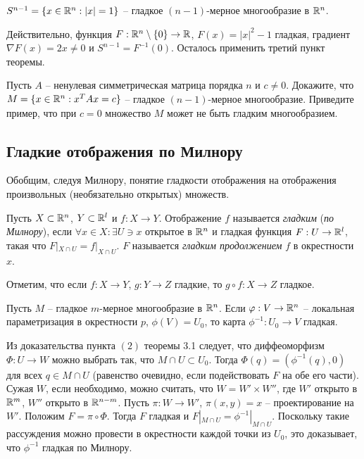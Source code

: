 \begin{example}
	$S^{n-1} = \{x \in \mathbb{R}^n : |x| = 1\}$ -- гладкое $(n-1)$-мерное многообразие в $\mathbb{R}^n$.
\end{example}

\begin{myproof}
	Действительно, функция $F : \mathbb{R}^n \setminus \{0\} \to \mathbb{R}$, $F(x) = |x|^2 - 1$ гладкая, градиент $\nabla F(x) = 2x \neq 0$ и $S^{n-1} = F^{-1}(0)$. 
	Осталось применить третий пункт теоремы.
\end{myproof}

\begin{problem}
	Пусть $A$ -- ненулевая симметрическая матрица порядка $n$ и $c \neq 0$.
	Докажите, что $M = \{x \in \mathbb{R}^n : x^T A x = c\}$ -- гладкое $(n-1)$-мерное многообразие. 
	Приведите пример, что при $c = 0$ множество $M$ может не быть гладким многообразием.
\end{problem}

\subsection{Гладкие отображения по Милнору}

Обобщим, следуя Милнору, понятие гладкости отображения на отображения произвольных (необязательно открытых) множеств.

\begin{definition}
	Пусть $X \subset \mathbb{R}^n$, $Y \subset \mathbb{R}^l$ и $f : X \to Y$. 
	Отображение $f$ называется \textit{гладким} (\textit{по Милнору}), если $\forall x \in X : \exists U \ni x$ открытое в $\mathbb{R}^n$ и 
	гладкая функция $F : U \to \mathbb{R}^l$, такая что $F|_{X \cap U} = f|_{X \cap U}$. 
	$F$ называется \textit{гладким продолжением} $f$ в окрестности $x$.
\end{definition}

\begin{note}
	Отметим, что если $f : X \to Y$, $g : Y \to Z$ гладкие, то $g \circ f : X \to Z$ гладкое.
\end{note}

\begin{lemma}
	Пусть $M$ -- гладкое $m$-мерное многообразие в $\mathbb{R}^n$. Если $\varphi: V \to \mathbb{R}^n$ -- локальная параметризация в окрестности $p$, 
	$\phi(V) = U_0$, то карта $\phi^{-1} : U_0 \to V$ гладкая.
\end{lemma}

\begin{myproof}
	Из доказательства пункта $(2)$ теоремы 3.1 следует, что диффеоморфизм $\Phi : U \to W$ можно выбрать так, что $M \cap U \subset U_0$. 
	Тогда $\Phi(q) = (\phi^{-1}(q), 0)$ для всех $q \in M \cap U$ (равенство очевидно, если подействовать $F$ на обе его части). 
	Сужая $W$, если необходимо, можно считать, что $W = W' \times W''$, где $W'$ открыто в $\mathbb{R}^m$, $W''$ открыто в $\mathbb{R}^{n-m}$. 
	Пусть $\pi : W \to W'$, $\pi(x, y) = x$ -- проектирование на $W'$. 
	Положим $F = \pi \circ \Phi$. Тогда $F$ гладкая и $F|_{M \cap U} = \phi^{-1}|_{M \cap U}$.
	Поскольку такие рассуждения можно провести в окрестности каждой точки из $U_0$, это доказывает, что $\phi^{-1}$ гладкая по Милнору. 
\end{myproof}

